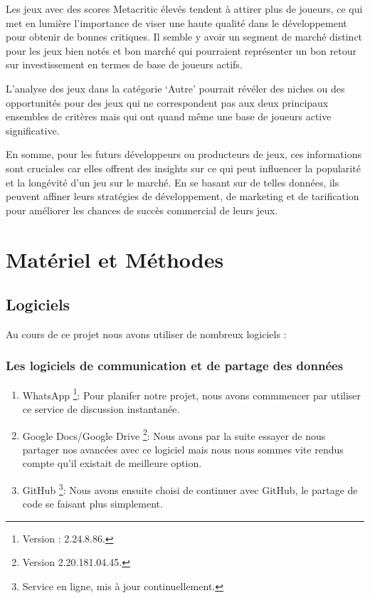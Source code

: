 \documentclass[mstat,12pt]{unswthesis}
\begin{document}
Les jeux avec des scores Metacritic élevés tendent à attirer plus de
joueurs, ce qui met en lumière l'importance de viser une haute qualité
dans le développement pour obtenir de bonnes critiques. Il semble y
avoir un segment de marché distinct pour les jeux bien notés et bon
marché qui pourraient représenter un bon retour sur investissement en
termes de base de joueurs actifs.

L'analyse des jeux dans la catégorie `Autre' pourrait révéler des niches
ou des opportunités pour des jeux qui ne correspondent pas aux deux
principaux ensembles de critères mais qui ont quand même une base de
joueurs active significative.

\bigskip

En somme, pour les futurs développeurs ou producteurs de jeux, ces
informations sont cruciales car elles offrent des insights sur ce qui
peut influencer la popularité et la longévité d'un jeu sur le marché. En
se basant sur de telles données, ils peuvent affiner leurs stratégies de
développement, de marketing et de tarification pour améliorer les
chances de succès commercial de leurs jeux.

\normalsize

\hypertarget{matuxe9riel-et-muxe9thodes}{%
\chapter{Matériel et Méthodes}\label{matuxe9riel-et-muxe9thodes}}

\hypertarget{logiciels}{%
\section{Logiciels}\label{logiciels}}

Au cours de ce projet nous avons utiliser de nombreux logiciels :

\hypertarget{les-logiciels-de-communication-et-de-partage-des-donnuxe9es}{%
\subsection{Les logiciels de communication et de partage des
données}\label{les-logiciels-de-communication-et-de-partage-des-donnuxe9es}}

\begin{enumerate}
\def\labelenumi{\arabic{enumi}.}
\item
  WhatsApp \footnote{Version : 2.24.8.86.}: Pour planifer notre projet,
  nous avons commmencer par utiliser ce service de discussion
  instantanée.
\item
  Google Docs/Google Drive \footnote{Version 2.20.181.04.45.}: Nous
  avons par la suite essayer de nous partager nos avancées avec ce
  logiciel mais nous nous sommes vite rendus compte qu'il existait de
  meilleure option.
\item
  GitHub \footnote{Service en ligne, mis à jour continuellement.}: Nous
  avons ensuite choisi de continuer avec GitHub, le partage de code se
  faisant plus simplement.
\end{enumerate}
\end{document}
